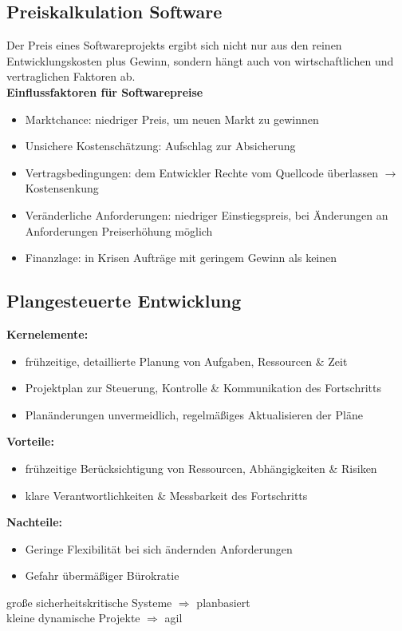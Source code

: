 \documentclass[12pt,a4paper,oneside]{article}
\begin{document}
\subsection{Preiskalkulation Software}

Der Preis eines Softwareprojekts ergibt sich nicht nur aus den reinen Entwicklungskosten plus Gewinn, sondern hängt auch von wirtschaftlichen und vertraglichen Faktoren ab. \\

\noindent
\textbf{Einflussfaktoren für Softwarepreise}
\begin{itemize}
\item Marktchance: niedriger Preis, um neuen Markt zu gewinnen
\item Unsichere Kostenschätzung: Aufschlag zur Absicherung
\item Vertragsbedingungen: dem Entwickler Rechte vom Quellcode überlassen $\rightarrow$ Kostensenkung
\item Veränderliche Anforderungen: niedriger Einstiegspreis, bei Änderungen an Anforderungen Preiserhöhung möglich
\item Finanzlage: in Krisen Aufträge mit geringem Gewinn als keinen
\end{itemize}

\subsection{Plangesteuerte Entwicklung}

\textbf{Kernelemente:}
\begin{itemize}
\item frühzeitige, detaillierte Planung von Aufgaben, Ressourcen \& Zeit
\item Projektplan zur Steuerung, Kontrolle \& Kommunikation des Fortschritts
\item Planänderungen unvermeidlich, regelmäßiges Aktualisieren der Pläne
\end{itemize}
\noindent
\textbf{Vorteile:}
\begin{itemize}
\item frühzeitige Berücksichtigung von Ressourcen, Abhängigkeiten \& Risiken
\item klare Verantwortlichkeiten \& Messbarkeit des Fortschritts
\end{itemize}\noindent
\textbf{Nachteile:}
\begin{itemize}
\item Geringe Flexibilität bei sich ändernden Anforderungen
\item Gefahr übermäßiger Bürokratie
\end{itemize}
\noindent
große sicherheitskritische Systeme $\Rightarrow$ planbasiert \\
kleine dynamische Projekte $\Rightarrow$ agil
\end{document}
